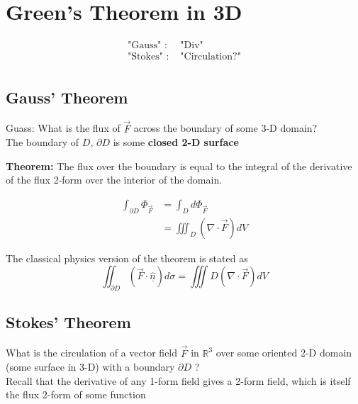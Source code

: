 \section{Green's Theorem in 3D}
\begin{align*}
   \text{"Gauss" } :& \text{ "Div"} \\
   \text{"Stokes" } :& \text{ "Circulation?"} \\
\end{align*}

\subsection{Gauss' Theorem}

Guass: What is the flux of $\vec{F}$ across the boundary of some 3-D domain?  \\

The boundary of $D$, $\partial D$ is some \textbf{closed 2-D surface}

\begin{framed}
   \textbf{Theorem:} The flux over the boundary is equal to the integral of the derivative of the flux 2-form over the interior of the domain.

   \begin{align*}
      \int_{\partial D}^{} \Phi_{\vec{F}} &= \int_{D}^{} d \Phi_{\vec{F}}   \\
                                          &= \iiint_{D} \left( \nabla \cdot \vec{F} \right) dV
   \end{align*}

   The classical physics version of the theorem is stated as 
   \[
      \iint_{\partial D} \left( \vec{F} \cdot \hat{ \underline{n}} \right)  d\sigma = \iiint{D} \left( \nabla \cdot \vec{F} \right) dV
   \] 
\end{framed}

\subsection{Stokes' Theorem}

What is the circulation of a vector field $\vec{F} $ in $\mathbb{R}^3$ over some oriented 2-D domain (some surface in 3-D) with a boundary $\partial D$ ? \\  


Recall that the derivative of any 1-form field gives a 2-form field, which is itself the flux 2-form of some function 

